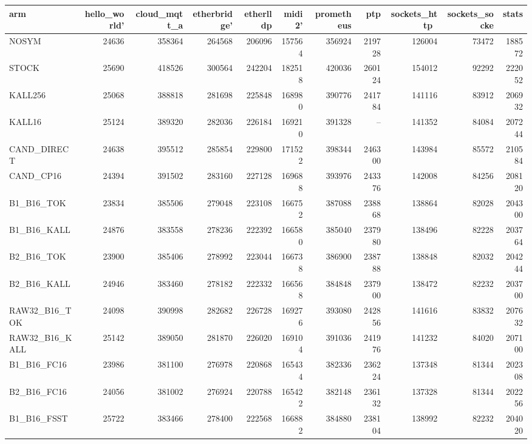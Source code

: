 \begin{tabular}{lrrrrrrrrrr}
\toprule
arm & hello\_world' & cloud\_mqtt\_a & etherbridge' & etherlldp & midi2' & prometheus & ptp & sockets\_http\ & sockets\_socke & stats \\
\midrule
NOSYM & 24636 & 358364 & 264568 & 206096 & 157564 & 356924 & 219728 & 126004 & 73472 & 188572 \\
STOCK & 25690 & 418526 & 300564 & 242204 & 182518 & 420036 & 260124 & 154012 & 92292 & 222052 \\
KALL256 & 25068 & 388818 & 281698 & 225848 & 168980 & 390776 & 241784 & 141116 & 83912 & 206932 \\
KALL16 & 25124 & 389320 & 282036 & 226184 & 169210 & 391328 & -- & 141352 & 84084 & 207244 \\
CAND\_DIRECT & 24638 & 395512 & 285854 & 229800 & 171522 & 398344 & 246300 & 143984 & 85572 & 210584 \\
CAND\_CP16 & 24394 & 391502 & 283160 & 227128 & 169688 & 393976 & 243376 & 142008 & 84256 & 208120 \\
B1\_B16\_TOK & 23834 & 385506 & 279048 & 223108 & 166752 & 387088 & 238868 & 138864 & 82028 & 204300 \\
B1\_B16\_KALL & 24876 & 383558 & 278236 & 222392 & 166580 & 385040 & 237980 & 138496 & 82228 & 203764 \\
B2\_B16\_TOK & 23900 & 385406 & 278992 & 223044 & 166738 & 386900 & 238788 & 138848 & 82032 & 204244 \\
B2\_B16\_KALL & 24946 & 383460 & 278182 & 222332 & 166568 & 384848 & 237900 & 138472 & 82232 & 203700 \\
RAW32\_B16\_TOK & 24098 & 390998 & 282682 & 226728 & 169276 & 393080 & 242856 & 141616 & 83832 & 207632 \\
RAW32\_B16\_KALL & 25142 & 389050 & 281870 & 226020 & 169104 & 391036 & 241976 & 141232 & 84020 & 207100 \\
B1\_B16\_FC16 & 23986 & 381100 & 276978 & 220868 & 165434 & 382336 & 236224 & 137348 & 81344 & 202308 \\
B2\_B16\_FC16 & 24056 & 381002 & 276924 & 220788 & 165422 & 382148 & 236132 & 137328 & 81344 & 202256 \\
B1\_B16\_FSST & 25722 & 383466 & 278400 & 222568 & 166882 & 384880 & 238104 & 138992 & 82232 & 204020 \\
\bottomrule
\end{tabular}

